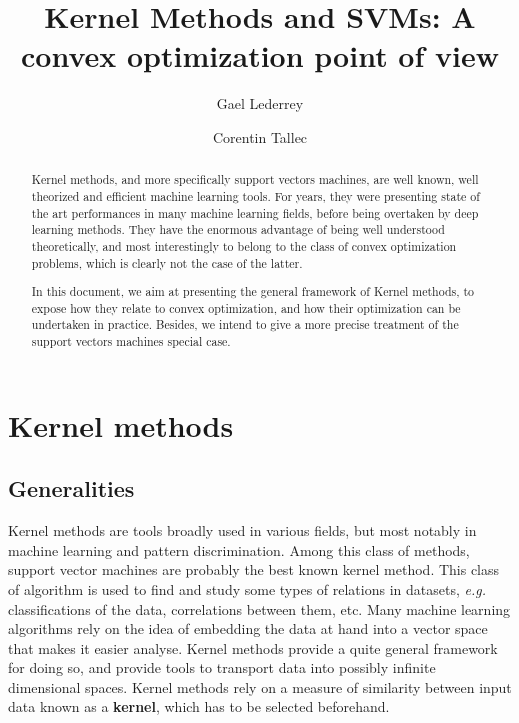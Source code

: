 \documentclass[a4paper, 11pt]{article}
\title{Kernel Methods and SVMs:
A convex optimization point of view}
\author{Gael Lederrey\\
  \and
Corentin Tallec}
\begin{document}
\maketitle
\begin{abstract}
  Kernel methods, and more specifically support vectors machines, are
  well known, well theorized and efficient machine learning tools. For
  years, they were presenting state of the art performances in many
  machine learning fields, before being overtaken by deep learning
  methods. They have the enormous advantage of being well understood
  theoretically, and most interestingly to belong to the class of
  convex optimization problems, which is clearly not the case of the
  latter.

  In this document, we aim at presenting the general framework of
  Kernel methods, to expose how they relate to convex optimization,
  and how their optimization can be undertaken in practice. Besides,
  we intend to give a more precise treatment of the support vectors
  machines special case.
\end{abstract}

\section{Kernel methods}
\subsection{Generalities}

Kernel methods are tools broadly used in various fields, but most notably in
machine learning and pattern discrimination. Among this class of methods,
support vector machines are probably the best known kernel method. This class
of algorithm is used to find and study some types of relations in datasets,
{\it e.g.} classifications of the data, correlations between them, etc. Many
machine learning algorithms rely on the idea of embedding the data at hand
into a vector space that makes it easier analyse. Kernel methods provide
a quite general framework for doing so, and provide tools to transport data
into possibly infinite dimensional spaces. Kernel methods rely on a measure
of similarity between input data known as a {\bf kernel}, which has to be selected
beforehand.
\end{document}
